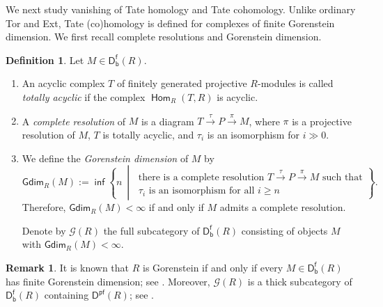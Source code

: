 \documentclass[10pt, a4paper,reqno]{amsart}
\theoremstyle{definition}
\newtheorem{dfn}[dfn]{Definition}
\newtheorem{rmk}[rmk]{Remark}
\theoremstyle{remark}
\numberwithin{equation}{thm}
\def\cG{\mathcal{G}}
\def\Ext{\operatorname{\mathsf{Ext}}}
\def\Hom{\operatorname{\mathsf{Hom}}}
\def\Dfb{\mathsf{D^f_b}}
\def\Pf{\mathsf{D^{pf}}}
\def\rHom{\mathbb{R}\mathsf{Hom}}
\def\inf{\operatorname{\mathsf{inf}}}
\def\Gdim{\mathsf{Gdim}}
\def\qpd{\operatorname{\mathsf{qpd}}}
\begin{document}

We next study vanishing of Tate homology and Tate cohomology. 
Unlike ordinary Tor and Ext, Tate (co)homology is defined for complexes of finite Gorenstein dimension. 
We first recall complete resolutions and Gorenstein dimension.

\begin{dfn}
Let $M \in \Dfb(R)$.
\begin{enumerate}[\rm(1)]
\item
An acyclic complex $T$ of finitely generated projective $R$-modules is called {\em totally acyclic} if the complex $\Hom_R(T,R)$ is acyclic.
\item
A {\em complete resolution} of $M$ is a diagram $T \xrightarrow{\tau} P \xrightarrow{\pi} M$, where $\pi$ is a projective resolution of $M$, $T$ is totally acyclic, and $\tau_i$ is an isomorphism for $i \gg 0$.
\item
We define the {\em Gorenstein dimension} of $M$ by 
\[
\Gdim_R(M)
:=
\inf\left\{
n \ \middle|\
\begin{array}{l}
\mbox{there is a complete resolution } T \xrightarrow{\tau} P \xrightarrow{\pi} M \mbox{ such that}\\
\mbox{$\tau_i$ is an isomorphism for all $i \ge n$}
\end{array}
\right\}.
\]
Therefore, $\Gdim_R(M) < \infty$ if and only if $M$ admits a complete resolution.

Denote by $\cG(R)$ the full subcategory of $\Dfb(R)$ consisting of objects $M$ with $\Gdim_R(M)< \infty$.
\end{enumerate}
\end{dfn}


\begin{rmk}
It is known that $R$ is Gorenstein if and only if every $M \in \Dfb(R)$ has finite Gorenstein dimension; see \cite[2.3.14]{Gbook}.
Moreover, $\cG(R)$ is a thick subcategory of $\Dfb(R)$ containing $\Pf(R)$; see \cite[Lemma 2.1.12]{Gbook}.
\end{rmk}
\end{document}
